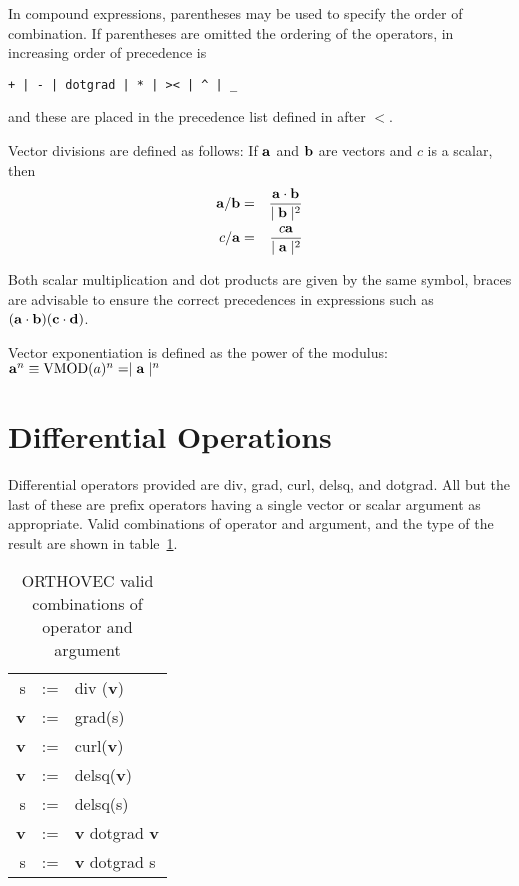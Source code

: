 In compound expressions, parentheses may be used to specify the order of
combination.  If parentheses are omitted the ordering of the
operators, in increasing order of precedence is
\begin{verbatim}
+ | - | dotgrad | * | >< | ^ | _
\end{verbatim}
and these are placed in the precedence list defined in \REDUCE{}
after $<$.

Vector divisions are defined as follows:  If ${\bf a}$ and ${\bf b}$ are
vectors and $c$ is a scalar, then
\begin{eqnarray*}
{\bf a} /  {\bf b} & = &  \frac{{\bf a} \cdot {\bf b}}{  \mid {\bf b}
\mid^2}\\
c / {\bf a}   & = &  \frac{c {\bf a}  }{ \mid {\bf a} \mid^2}
\end{eqnarray*}

Both scalar multiplication and dot products are given by the same symbol,
braces are advisable to ensure the correct
precedences in expressions such as $({\bf a} \cdot {\bf b})
({\bf c} \cdot {\bf d})$.

Vector exponentiation is defined as the power of the modulus:\\
${\bf a}^n \equiv  {\rm VMOD}(a)^n =   \mid {\bf a} \mid^n$

\section{Differential Operations}
Differential operators provided are div, grad, curl, delsq, and dotgrad.
All but the last of these are prefix operators having a single
vector or scalar argument as appropriate.  Valid combinations of
operator and argument, and the type of the result are shown in
table~\ref{vvecttable}.


\begin{table}
\begin{center}
\begin{tabular}{rcl}
s & := & div ({\bf v})  \\
{\bf v} & := & grad(s) \\
{\bf v} & := & curl({\bf v})  \\
{\bf v} & := & delsq({\bf v}) \\
 s  & := & delsq(s) \\
{\bf v} & := & {\bf v}  dotgrad {\bf v}  \\
 s & := & {\bf v}  dotgrad  s
\end{tabular}
\end{center}
\caption{ORTHOVEC valid combinations of operator and argument}\label{vvecttable}
\end{table}

